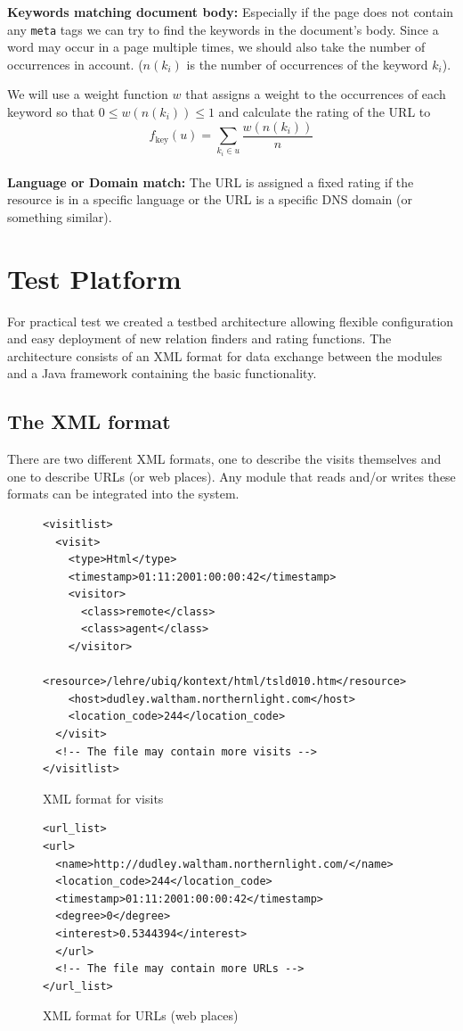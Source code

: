 \documentclass[a4paper]{danarticle}
\begin{document}
    \textbf{Keywords matching document body:} Especially if the page does not
    contain any \verb$meta$ tags we can try to find the keywords in the
    document's body. Since a word may occur in a page multiple times, we should
    also take the number of occurrences in account. ($ n(k_i) $ is the number of
    occurrences of the keyword $ k_i $).
    
    We will use a weight function $ w $ that assigns a weight to the occurrences
    of each keyword so that $ 0 \leq w(n(k_i)) \leq 1 $ and calculate the
    rating of the URL to
    \[
      f_{\mbox{key}}(u) = \sum_{k_i \in u} \frac{w(n(k_i))}{n}
    \]
    \\
    
    \textbf{Language or Domain match:} The URL is assigned a fixed
    rating if the resource is in a specific language or the URL is a
    specific DNS domain (or something similar).
  \section*{Test Platform}
    For practical test we created a testbed architecture allowing flexible
    configuration and easy deployment of new relation finders and
    rating functions. The architecture consists of an XML format for
    data exchange between the modules and a Java framework containing the basic
    functionality.
    \subsection*{The XML format}
      There are two different XML formats, one to describe the visits themselves
      and one to describe URLs (or web places). Any module that reads and/or
      writes these formats can be integrated into the system.
      \begin{figure}[h]
\begin{verbatim}
<visitlist>
  <visit>
    <type>Html</type>
    <timestamp>01:11:2001:00:00:42</timestamp>
    <visitor>
      <class>remote</class>
      <class>agent</class>
    </visitor>
    <resource>/lehre/ubiq/kontext/html/tsld010.htm</resource>
    <host>dudley.waltham.northernlight.com</host>
    <location_code>244</location_code>
  </visit>
  <!-- The file may contain more visits -->
</visitlist>
\end{verbatim}
        \caption{XML format for visits}
	\label{visitxml}
      \end{figure}
      \begin{figure}[h]
\begin{verbatim}
<url_list>
<url>
  <name>http://dudley.waltham.northernlight.com/</name>
  <location_code>244</location_code>
  <timestamp>01:11:2001:00:00:42</timestamp>
  <degree>0</degree>
  <interest>0.5344394</interest>
  </url>
  <!-- The file may contain more URLs -->
</url_list>
\end{verbatim}
        \caption{XML format for URLs (web places)}
	\label{urlxml}
      \end{figure}
\end{document}
